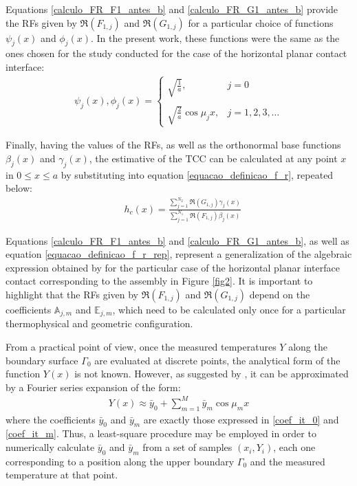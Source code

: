 \documentclass[12pt]{CHT-20}
\begin{document}
Equations \eqref{calculo_FR_F1_antes_b} and \eqref{calculo_FR_G1_antes_b} provide the RFs given by $\Re(F_{1,j})$ and $\Re(G_{1,j})$ for a particular choice of functions $\psi_j(x)$ and $\phi_j(x)$. In the present work, these functions were the same as the ones chosen for the study conducted \cite{artigo_padilha_3} for the case of the horizontal planar contact interface:
\begin{align}
\psi_j(x), \phi_j(x) = \left\lbrace
\begin{array}{ll}
\displaystyle\sqrt{\frac{1}{a}}, & j = 0 \\  \nonumber \\
\displaystyle\sqrt{\frac{2}{a}}\cos \mu_j x, & j = 1,2,3,\ldots
\end{array}
\right.
\end{align} 

Finally, having the values of the RFs, as well as the orthonormal base functions $\beta_j(x)$ and $\gamma_j(x)$, the estimative of the TCC can be calculated at any point $x$ in $0 \le x \le a$ by substituting into equation \eqref{equacao_definicao_f_r}, repeated below:
\begin{align}
&h_c(x) %
= \frac{\displaystyle\sum_{j=1}^{N_2} \Re(G_{1,j}) \gamma_j(x)}{\displaystyle\sum_{j=1}^{N_1} \Re(F_{1,j}) \beta_j(x)}
\label{equacao_definicao_f_r_rep}
\end{align}

Equations \eqref{calculo_FR_F1_antes_b} and \eqref{calculo_FR_G1_antes_b}, as well as equation \eqref{equacao_definicao_f_r_rep}, represent a generalization of the algebraic expression obtained by \cite{artigo_padilha_3} for the particular case of the horizontal planar interface contact corresponding to the assembly in Figure \ref{fig2}. It is important to highlight that the RFs given by $\Re(F_{1,j})$ and $\Re(G_{1,j})$ depend on the coefficients $\mathbb{A}_{j,m}$ and $\mathbb{E}_{j,m}$, which need to be calculated only once for a particular thermophysical and geometric configuration.

From a practical point of view, once the measured temperatures $Y$ along the boundary surface $\Gamma_0$ are evaluated at discrete points, the analytical form of the function $Y(x)$ is not known. However, as suggested by \cite{artigo_mocerino}, it can be approximated by a Fourier series expansion of the form:
\begin{align}
Y(x) \approx \bar{y}_0 + \sum_{m=1}^M \bar{y}_m \cos\mu_m x \label{aproximacao_Y}
\end{align}
where the coefficients $\bar{y}_0$ and $\bar{y}_m$ are exactly those expressed in \eqref{coef_it_0} and \eqref{coef_it_m}. Thus, a least-square procedure may be employed in order to numerically calculate $\bar{y}_0$ and $\bar{y}_m$ from a set of samples $(x_i, Y_i)$, each one corresponding to a position along the upper boundary $\Gamma_0$ and the measured temperature at that point.
\end{document}
